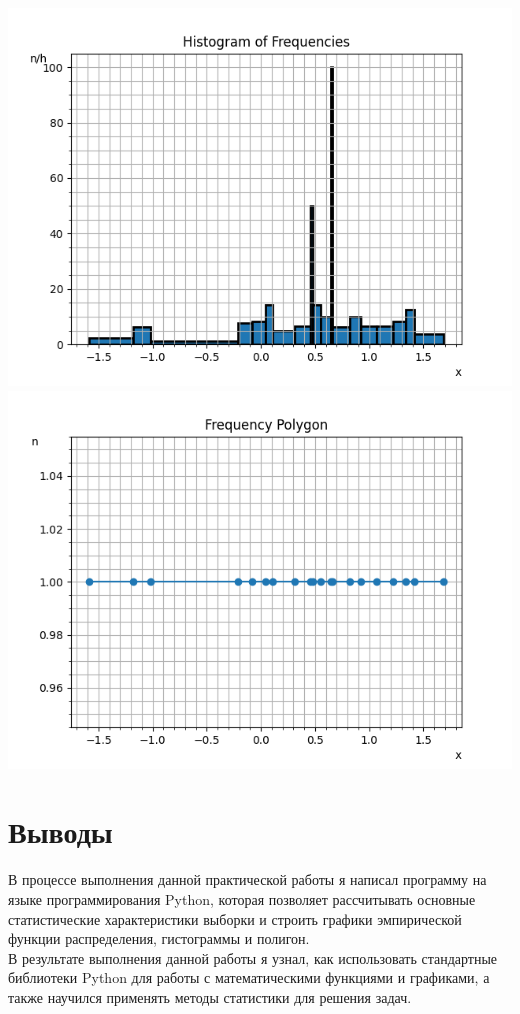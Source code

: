 \documentclass[12pt,one column]{article}
\begin{document}
\includegraphics[width=\textwidth]{img/plot2.png}
\includegraphics[width=\textwidth]{img/plot3.png}

\section{Выводы}
В процессе выполнения данной практической работы я написал программу на языке программирования Python, которая позволяет рассчитывать основные статистические характеристики выборки и строить графики эмпирической функции распределения, гистограммы и полигон.\\

В результате выполнения данной работы я узнал, как использовать стандартные библиотеки Python для работы с математическими функциями и графиками, а также научился применять методы статистики для решения задач.
\end{document}
